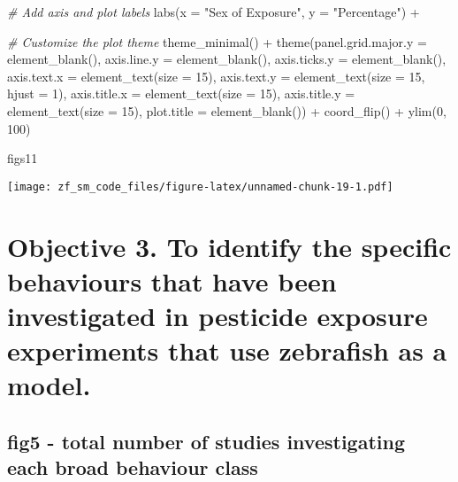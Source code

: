\documentclass[
]{article}
\newenvironment{Shaded}{\begin{snugshade}}{\end{snugshade}}
\newcommand{\AttributeTok}[1]{\textcolor[rgb]{0.77,0.63,0.00}{#1}}
\newcommand{\CommentTok}[1]{\textcolor[rgb]{0.56,0.35,0.01}{\textit{#1}}}
\newcommand{\DecValTok}[1]{\textcolor[rgb]{0.00,0.00,0.81}{#1}}
\newcommand{\FunctionTok}[1]{\textcolor[rgb]{0.00,0.00,0.00}{#1}}
\newcommand{\NormalTok}[1]{#1}
\newcommand{\SpecialCharTok}[1]{\textcolor[rgb]{0.00,0.00,0.00}{#1}}
\newcommand{\StringTok}[1]{\textcolor[rgb]{0.31,0.60,0.02}{#1}}
\begin{document}
\begin{Shaded}
\begin{Highlighting}[]
  \CommentTok{\# Add axis and plot labels }
  \FunctionTok{labs}\NormalTok{(}\AttributeTok{x =} \StringTok{"Sex of Exposure"}\NormalTok{, }\AttributeTok{y =} \StringTok{"Percentage"}\NormalTok{) }\SpecialCharTok{+}
  
  \CommentTok{\# Customize the plot theme }
   \FunctionTok{theme\_minimal}\NormalTok{() }\SpecialCharTok{+}
  \FunctionTok{theme}\NormalTok{(}\AttributeTok{panel.grid.major.y =} \FunctionTok{element\_blank}\NormalTok{(),}
    \AttributeTok{axis.line.y =} \FunctionTok{element\_blank}\NormalTok{(),}
    \AttributeTok{axis.ticks.y =} \FunctionTok{element\_blank}\NormalTok{(),}
    \AttributeTok{axis.text.x =} \FunctionTok{element\_text}\NormalTok{(}\AttributeTok{size =} \DecValTok{15}\NormalTok{),}
    \AttributeTok{axis.text.y =} \FunctionTok{element\_text}\NormalTok{(}\AttributeTok{size =} \DecValTok{15}\NormalTok{, }\AttributeTok{hjust =} \DecValTok{1}\NormalTok{),}
    \AttributeTok{axis.title.x =} \FunctionTok{element\_text}\NormalTok{(}\AttributeTok{size =} \DecValTok{15}\NormalTok{),}
    \AttributeTok{axis.title.y =} \FunctionTok{element\_text}\NormalTok{(}\AttributeTok{size =} \DecValTok{15}\NormalTok{),}
    \AttributeTok{plot.title =} \FunctionTok{element\_blank}\NormalTok{()) }\SpecialCharTok{+}
  \FunctionTok{coord\_flip}\NormalTok{() }\SpecialCharTok{+} 
  \FunctionTok{ylim}\NormalTok{(}\DecValTok{0}\NormalTok{, }\DecValTok{100}\NormalTok{)}

\NormalTok{figs11}
\end{Highlighting}
\end{Shaded}

\texttt{[image: zf\_sm\_code\_files/figure-latex/unnamed-chunk-19-1.pdf]}

\hypertarget{objective-3.-to-identify-the-specific-behaviours-that-have-been-investigated-in-pesticide-exposure-experiments-that-use-zebrafish-as-a-model.}{%
\section{Objective 3. To identify the specific behaviours that have been
investigated in pesticide exposure experiments that use zebrafish as a
model.}\label{objective-3.-to-identify-the-specific-behaviours-that-have-been-investigated-in-pesticide-exposure-experiments-that-use-zebrafish-as-a-model.}}

\hypertarget{fig5---total-number-of-studies-investigating-each-broad-behaviour-class}{%
\subsection{fig5 - total number of studies investigating each broad
behaviour
class}\label{fig5---total-number-of-studies-investigating-each-broad-behaviour-class}}
\end{document}

